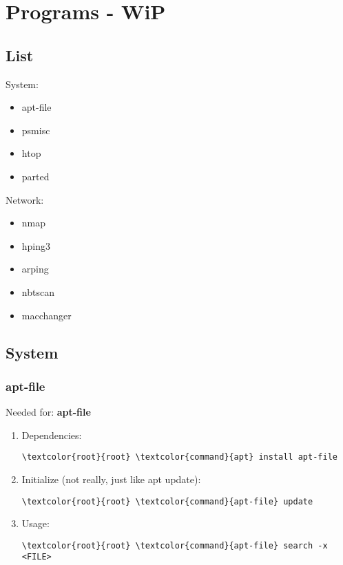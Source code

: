 \documentclass[10pt, a4paper, onecolumn, openany]{book} %
\begin{document}
\chapter{Programs - WiP}
\section{List}
System:
\begin{itemize}
    \item apt-file
    \item psmisc
    \item htop
    \item parted
\end{itemize}
Network:
\begin{itemize}
    \item nmap
    \item hping3
    \item arping
    \item nbtscan
    \item macchanger
\end{itemize}
\section{System}
\subsection{apt-file}
Needed for: \textbf{apt-file}
\begin{enumerate}
    \item Dependencies:
\begin{Verbatim}[commandchars=\\\{\}]
\textcolor{root}{root} \textcolor{command}{apt} install apt-file
\end{Verbatim}
    \item Initialize (not really, just like apt update):
\begin{Verbatim}[commandchars=\\\{\}]
\textcolor{root}{root} \textcolor{command}{apt-file} update
\end{Verbatim}
    \item Usage:
\begin{Verbatim}[commandchars=\\\{\}]
\textcolor{root}{root} \textcolor{command}{apt-file} search -x <FILE>
\end{Verbatim}
\end{enumerate}
\end{document}
